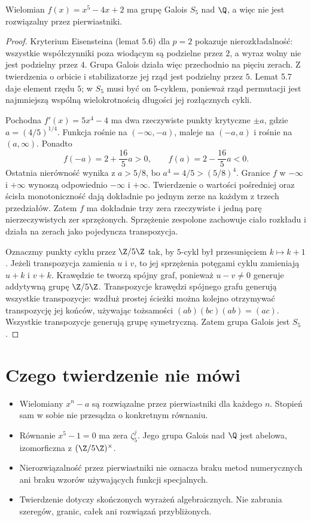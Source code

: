 \begin{twierdzenie}
Wielomian $f(x)=x^5-4x+2$ ma grupę Galois $S_5$ nad $\Q$, a więc nie jest rozwiązalny przez pierwiastniki.
\end{twierdzenie}
\begin{proof}
Kryterium Eisensteina (lemat 5.6) dla $p=2$ pokazuje nierozkładalność: wszystkie współczynniki poza wiodącym są podzielne przez $2$, a wyraz wolny nie jest podzielny przez $4$. Grupa Galois działa więc przechodnio na pięciu zerach. Z twierdzenia o orbicie i stabilizatorze jej rząd jest podzielny przez $5$. Lemat 5.7 daje element rzędu $5$; w $S_5$ musi być on $5$-cyklem, ponieważ rząd permutacji jest najmniejszą wspólną wielokrotnością długości jej rozłącznych cykli.

Pochodna $f'(x)=5x^4-4$ ma dwa rzeczywiste punkty krytyczne $\pm a$, gdzie $a=(4/5)^{1/4}$. Funkcja rośnie na $(-\infty,-a)$, maleje na $(-a,a)$ i rośnie na $(a,\infty)$. Ponadto
\[
f(-a)=2+\frac{16}{5}a>0,\qquad
f(a)=2-\frac{16}{5}a<0.
\]
Ostatnia nierówność wynika z $a>5/8$, bo $a^4=4/5>(5/8)^4$. Granice $f$ w $-\infty$ i $+\infty$ wynoszą odpowiednio $-\infty$ i $+\infty$. Twierdzenie o wartości pośredniej oraz ścisła monotoniczność dają dokładnie po jednym zerze na każdym z trzech przedziałów. Zatem $f$ ma dokładnie trzy zera rzeczywiste i jedną parę nierzeczywistych zer sprzężonych. Sprzężenie zespolone zachowuje ciało rozkładu i działa na zerach jako pojedyncza transpozycja.

Oznaczmy punkty cyklu przez $\Z/5\Z$ tak, by $5$-cykl był przesunięciem $k\mapsto k+1$. Jeżeli transpozycja zamienia $u$ i $v$, to jej sprzężenia potęgami cyklu zamieniają $u+k$ i $v+k$. Krawędzie te tworzą spójny graf, ponieważ $u-v\ne0$ generuje addytywną grupę $\Z/5\Z$. Transpozycje krawędzi spójnego grafu generują wszystkie transpozycje: wzdłuż prostej ścieżki można kolejno otrzymywać transpozycję jej końców, używając tożsamości $(ab)(bc)(ab)=(ac)$. Wszystkie transpozycje generują grupę symetryczną. Zatem grupa Galois jest $S_5$.
\end{proof}

\section{Czego twierdzenie nie mówi}
\begin{itemize}
\item Wielomiany $x^n-a$ są rozwiązalne przez pierwiastniki dla każdego $n$. Stopień sam w sobie nie przesądza o konkretnym równaniu.
\item Równanie $x^5-1=0$ ma zera $\zeta_5^j$. Jego grupa Galois nad $\Q$ jest abelowa, izomorficzna z $(\Z/5\Z)^\times$.
\item Nierozwiązalność przez pierwiastniki nie oznacza braku metod numerycznych ani braku wzorów używających funkcji specjalnych.
\item Twierdzenie dotyczy skończonych wyrażeń algebraicznych. Nie zabrania szeregów, granic, całek ani rozwiązań przybliżonych.
\end{itemize}


